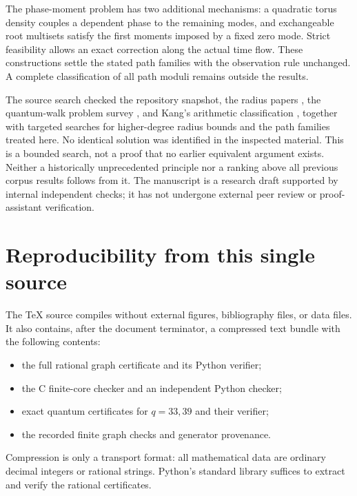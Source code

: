 \documentclass[11pt,a4paper]{article}
\theoremstyle{definition}\newtheorem{definition}[theorem]{Definition}
\theoremstyle{remark}\newtheorem{remark}[theorem]{Remark}
\begin{document}
The phase-moment problem has two additional mechanisms: a quadratic
torus density couples a dependent phase to the remaining modes, and
exchangeable root multisets satisfy the first moments imposed by a
fixed zero mode. Strict feasibility allows an exact correction along
the actual time flow. These constructions settle the stated path
families with the observation rule unchanged. A complete classification
of all path moduli remains outside the results.

The source search checked the repository snapshot, the radius papers
\cite{CPS,Doig2023}, the quantum-walk problem survey
\cite{CoutinhoGuo2024}, and Kang's arithmetic classification
\cite{Kang2026}, together with targeted searches for higher-degree
radius bounds and the path families treated here. No identical solution
was identified in the inspected material. This is a bounded search,
not a proof that no earlier equivalent argument exists. Neither a
historically unprecedented principle nor a ranking above all previous
corpus results follows from it. The manuscript is a research draft
supported by internal independent checks; it has not undergone external
peer review or proof-assistant verification.

\appendix
\section{Reproducibility from this single source}
\label{app:repro}

The TeX source compiles without external figures, bibliography files,
or data files. It also contains, after the document terminator, a
compressed text bundle with the following contents:
\begin{itemize}[nosep]
\item the full rational graph certificate and its Python verifier;
\item the C finite-core checker and an independent Python checker;
\item exact quantum certificates for $q=33,39$ and their verifier;
\item the recorded finite graph checks and generator provenance.
\end{itemize}
Compression is only a transport format: all mathematical data are
ordinary decimal integers or rational strings. Python's standard
library suffices to extract and verify the rational certificates.
\end{document}
